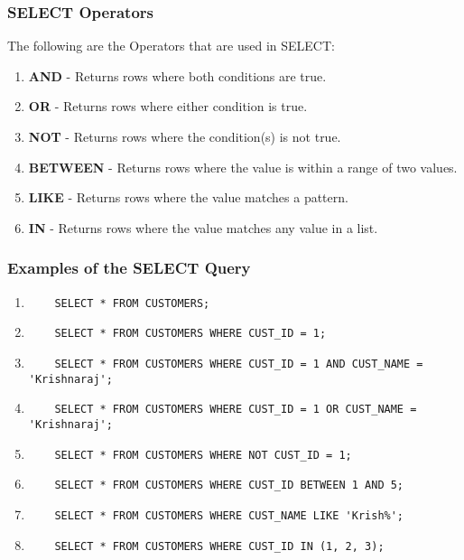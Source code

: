 \documentclass[11pt]{article}
\begin{document}
\subsubsection{SELECT Operators}

The following are the Operators that are used in SELECT:

\begin{enumerate}
	\item \textbf{AND} - Returns rows where both conditions are true.
	\item \textbf{OR} - Returns rows where either condition is true.
	\item \textbf{NOT} - Returns rows where the condition(s) is not true.
	\item \textbf{BETWEEN} - Returns rows where the value is within a range of two values.
	\item \textbf{LIKE} - Returns rows where the value matches a pattern.
	\item \textbf{IN} - Returns rows where the value matches any value in a list.
\end{enumerate}

\subsubsection{Examples of the SELECT Query}




\begin{enumerate}
	\item
	      \begin{verbatim}
	SELECT * FROM CUSTOMERS;
	\end{verbatim}
	\item
	      \begin{verbatim}
	SELECT * FROM CUSTOMERS WHERE CUST_ID = 1;
	\end{verbatim}
	\item
	      \begin{verbatim}
	SELECT * FROM CUSTOMERS WHERE CUST_ID = 1 AND CUST_NAME = 'Krishnaraj';
	\end{verbatim}
	\item
	      \begin{verbatim}
	SELECT * FROM CUSTOMERS WHERE CUST_ID = 1 OR CUST_NAME = 'Krishnaraj';
	\end{verbatim}
	\item
	      \begin{verbatim}
	SELECT * FROM CUSTOMERS WHERE NOT CUST_ID = 1;
	\end{verbatim}
	\item
	      \begin{verbatim}
	SELECT * FROM CUSTOMERS WHERE CUST_ID BETWEEN 1 AND 5;
	\end{verbatim}
	\item
	      \begin{verbatim}
	SELECT * FROM CUSTOMERS WHERE CUST_NAME LIKE 'Krish%';
	\end{verbatim}
	\item
	      \begin{verbatim}
	SELECT * FROM CUSTOMERS WHERE CUST_ID IN (1, 2, 3);
	\end{verbatim}
\end{enumerate}
\end{document}
